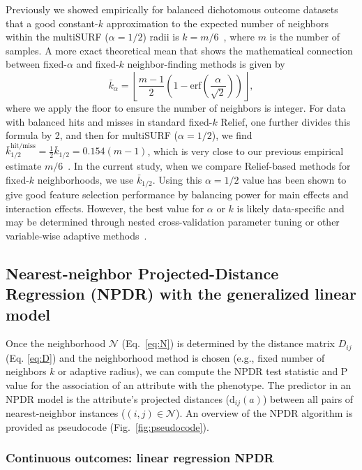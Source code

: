 \documentclass{bioinfo}
\begin{document}
Previously we showed empirically for balanced dichotomous outcome datasets that a good constant-$k$ approximation to the expected number of neighbors within the multiSURF ($\alpha=1/2$) radii is $k=m/6$~\citep{stir}, where $m$ is the number of samples.
A more exact theoretical mean that shows the mathematical connection between fixed-$\alpha$ and fixed-$k$ neighbor-finding methods is given by 
\begin{equation}\label{eq:kbar}
{\bar{k}}_{\alpha} = \left \lfloor \frac{m-1}{2}  \left( 1 - \mathrm{erf}\left( \frac{\alpha}{\sqrt{2}} \right) \right) \right \rfloor,
\end{equation}
where we apply the floor to ensure the number of neighbors is integer.
For data with balanced hits and misses in standard fixed-$k$ Relief, one further divides this formula by 2, and then for multiSURF ($\alpha=1/2$), we find $\bar{k}_{1/2}^{\text{hit/miss}} = \frac{1}{2}\bar{k}_{1/2} = 0.154 (m-1)$, which is very close to our previous empirical estimate $m/6$~\citep{stir}.
In the current study, when we compare Relief-based methods for fixed-$k$ neighborhoods, we use $\bar{k}_{1/2}$.
Using this $\alpha=1/2$ value has been shown to give good feature selection performance by balancing power for main effects and interaction effects.
However, the best value for $\alpha$ or $k$ is likely data-specific and may be determined through nested cross-validation parameter tuning or other variable-wise adaptive methods~\citep{mckinney13}.

\subsection{Nearest-neighbor Projected-Distance Regression (NPDR) with the generalized linear model}
Once the neighborhood $\mathcal{N}$ (Eq.~\ref{eq:N}) is determined by the distance matrix $D_{ij}$ (Eq. \ref{eq:D}) and the neighborhood method is chosen (e.g., fixed number of neighbors $k$ or adaptive radius), we can compute the NPDR test statistic and P value for the association of an attribute with the phenotype.
The predictor in an NPDR model is the attribute's projected distances ($\text{d}_{ij}(a)$) between all pairs of nearest-neighbor instances ($(i,j) \in \mathcal{N}$). An overview of the NPDR algorithm is provided as pseudocode (Fig.~\ref{fig:pseudocode}).

\subsubsection{Continuous outcomes: linear regression NPDR}\label{sec:regress}
\end{document}
